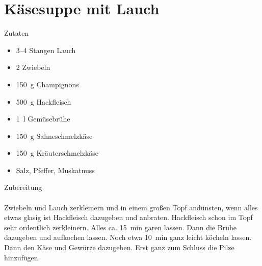 \section*{Käsesuppe mit Lauch}
\ihead{}\ohead{}
\cfoot{}
{\Large Zutaten}
\begin{multicols}{2}
\begin{itemize}
    \item \numrange{3}{4} Stangen Lauch
    \item \num{2} Zwiebeln
    \item \SI{150}{g} Champignons
    \item \SI{500}{g} Hackfleisch
    \item \SI{1}{l} Gemüsebrühe
    \item \SI{150}{g} Sahneschmelzkäse
    \item \SI{150}{g} Kräuterschmelzkäse
    \item Salz, Pfeffer, Muskatnuss
\end{itemize}
\end{multicols}
\noindent
{\Large Zubereitung}\\
\\
Zwiebeln und Lauch zerkleinern und in einem großen Topf andünsten, wenn alles etwas glasig ist Hackfleisch dazugeben und anbraten.
Hackfleisch schon im Topf sehr ordentlich zerkleinern. 
Alles ca. \SI{15}{min} garen lassen.
Dann die Brühe dazugeben und aufkochen lassen. 
Noch etwa \SI{10}{min} ganz leicht köcheln lassen.
Dann den Käse und Gewürze dazugeben.
Erst ganz zum Schluss die Pilze hinzufügen. 